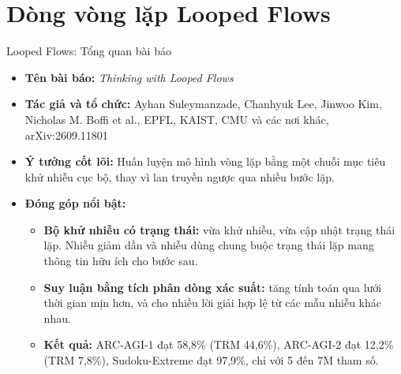 
\section{Dòng vòng lặp Looped Flows}

\begin{frame}{Looped Flows: Tổng quan bài báo}
    \begin{itemize}
        \item \textbf{Tên bài báo:} \textit{Thinking with Looped Flows}
        \item \textbf{Tác giả và tổ chức:} Ayhan Suleymanzade, Chanhyuk Lee, Jinwoo Kim, Nicholas M. Boffi et al., EPFL, KAIST, CMU và các nơi khác, arXiv:2609.11801
        \item \textbf{Ý tưởng cốt lõi:} Huấn luyện mô hình vòng lặp bằng một chuỗi mục tiêu khử nhiễu cục bộ, thay vì lan truyền ngược qua nhiều bước lặp.
        \item \textbf{Đóng góp nổi bật:}
        \begin{itemize}
            \item \textbf{Bộ khử nhiễu có trạng thái:} vừa khử nhiễu, vừa cập nhật trạng thái lặp. Nhiễu giảm dần và nhiễu dùng chung buộc trạng thái lặp mang thông tin hữu ích cho bước sau.
            \item \textbf{Suy luận bằng tích phân dòng xác suất:} tăng tính toán qua lưới thời gian mịn hơn, và cho nhiều lời giải hợp lệ từ các mẫu nhiễu khác nhau.
            \item \textbf{Kết quả:} ARC-AGI-1 đạt 58,8\% (TRM 44,6\%), ARC-AGI-2 đạt 12,2\% (TRM 7,8\%), Sudoku-Extreme đạt 97,9\%, chỉ với 5 đến 7M tham số.
        \end{itemize}
    \end{itemize}
\end{frame}

